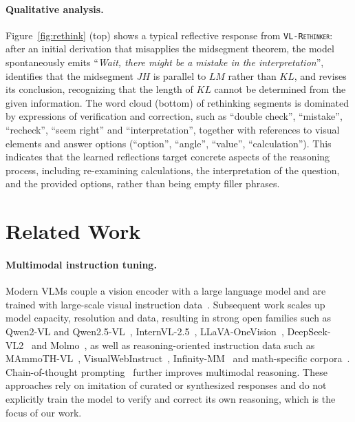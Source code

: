 \documentclass{article}
\newcommand{\model}{\texttt{\textsc{VL-Rethinker}}\xspace}
\begin{document}
\paragraph{Qualitative analysis.} Figure~\ref{fig:rethink} (top) shows a typical reflective response from \model: after an initial derivation that misapplies the midsegment theorem, the model spontaneously emits ``\emph{Wait, there might be a mistake in the interpretation}'', identifies that the midsegment $JH$ is parallel to $LM$ rather than $KL$, and revises its conclusion, recognizing that the length of $KL$ cannot be determined from the given information. The word cloud (bottom) of rethinking segments is dominated by expressions of verification and correction, such as ``double check'', ``mistake'', ``recheck'', ``seem right'' and ``interpretation'', together with references to visual elements and answer options (``option'', ``angle'', ``value'', ``calculation''). This indicates that the learned reflections target concrete aspects of the reasoning process, including re-examining calculations, the interpretation of the question, and the provided options, rather than being empty filler phrases.

\section{Related Work}
\label{sec:related}

\paragraph{Multimodal instruction tuning.} Modern VLMs couple a vision encoder with a large language model and are trained with large-scale visual instruction data~\citep{llava,instructblip,minigpt4,li2023blip2bootstrappinglanguageimagepretraining}. Subsequent work scales up model capacity, resolution and data, resulting in strong open families such as Qwen2-VL and Qwen2.5-VL~\citep{qwen2vl,qwen2_5_vl}, InternVL-2.5~\citep{internvl_2_5}, LLaVA-OneVision~\citep{llavaov}, DeepSeek-VL2~\citep{deepseekvl2} and Molmo~\citep{molmo}, as well as reasoning-oriented instruction data such as MAmmoTH-VL~\citep{mammothvl}, VisualWebInstruct~\citep{visualwebinstruct}, Infinity-MM~\citep{infinity-mm} and math-specific corpora~\citep{shi2024mathllavabootstrappingmathematicalreasoning,gllava}. Chain-of-thought prompting~\citep{wei2022chain,feng2023towards,mitra2024compositionalchainofthoughtpromptinglarge} further improves multimodal reasoning. These approaches rely on imitation of curated or synthesized responses and do not explicitly train the model to verify and correct its own reasoning, which is the focus of our work.
\end{document}
